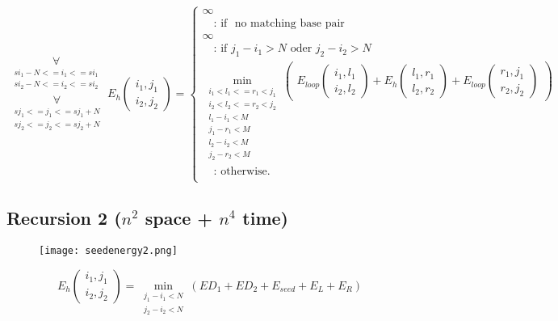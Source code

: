 \begin{equation*}
\substack{
  \underset{\substack{si_{1}-N <= i_{1} <= si_{1}\\si_{2}-N <= i_{2} <= si_{2}}}{\forall}\\
  \underset{\substack{sj_{1} <= j_{1} <= sj_{1}+N\\sj_{2} <= j_{2} <= sj_{2}+N}}{\forall}
}
E_h(\substack{i_1,j_1\\i_2,j_2}) = \begin{cases}
  \infty\\
  \quad\text{: if } \text{ no matching base pair }\\
  \infty\\
  \quad\text{: if } j_{1} - i_{1} > N \text{ oder } j_{2} - i_{2} > N\\
  \min\limits_{\substack{i_{1} < l_{1} <= r_{1} < j_{1}\\i_{2} < l_{2} <= r_{2} < j_{2}\\l_{1} - i_{1} < M\\j_{1}-r_{1} < M\\l_{2} - i_{2} < M\\j_{2}-r_{2} < M}}
  \begin{pmatrix}
	E_{loop}(\substack{i_1,l_1\\i_2,l_2}) + E_h(\substack{l_1,r_1\\l_2,r_2}) + E_{loop}(\substack{r_1,j_1\\r_2,j_2})
  \end{pmatrix}\\
  \quad\text{: otherwise.}\\
  
\end{cases}
\end{equation*}

\clearpage

\subsection{Recursion 2 ($n^{2}$ space + $n^{4}$ time)}

\begin{figure}[H]
	\centering
	\texttt{[image: seedenergy2.png]}
\end{figure}

\begin{equation*}
E_h(\substack{i_1,j_1\\i_2,j_2}) = \underset{\substack{j_{1} - i_{1} < N\\j_{2} - i_{2} < N}}{\min}(ED_{1} + ED_{2} + E_{seed} + E_{L} + E_{R})
\end{equation*}

